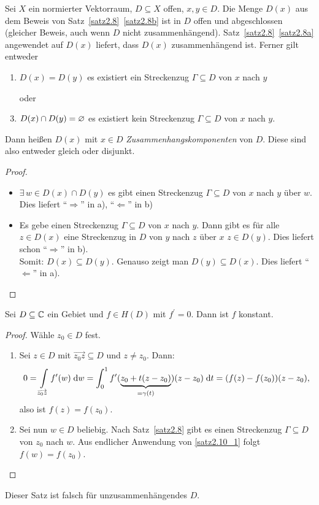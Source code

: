 \documentclass[a4paper,twoside,DIV15,BCOR12mm]{scrbook}
\begin{document}
\begin{bem} \label{bem2.9}
  Sei $X$ ein normierter Vektorraum, $D\subseteq X$ offen, $x, y\in D$. Die Menge $D(x)$ aus dem Beweis von
  Satz~\ref{satz2.8}~\ref{satz2.8b} ist in $D$ offen und abgeschlossen (gleicher Beweis, auch wenn $D$ nicht
  zusammenhängend). Satz~\ref{satz2.8}~\ref{satz2.8a} angewendet auf $D(x)$ liefert, dass $D(x)$ zusammenhängend ist. Ferner
  gilt entweder
  \begin{enumerate}
  \item $D(x)=D(y)$ \gdw es existiert ein Streckenzug $\Gamma\subseteq D$ von $x$ nach $y$
  \item[oder]
  \item $D(x)\cap D(y)=\varnothing$ \gdw es existiert kein Streckenzug $\Gamma\subseteq D$ von $x$ nach $y$.
  \end{enumerate}
  Dann heißen $D(x)$ mit $x\in D$ \emph{Zusammenhangskomponenten} von $D$. Diese sind also entweder gleich oder disjunkt.
\end{bem}
\begin{proof}
  \begin{itemize}
  \item $\exists\,w\in D(x)\cap D(y)$ \folgt es gibt einen Streckenzug $\Gamma\subseteq D$ von $x$ nach $y$ über $w$. Dies
    liefert "`$\Rightarrow$"' in a), "`$\Leftarrow$"' in b)
  \item Es gebe einen Streckenzug $\Gamma\subseteq D$ von $x$ nach $y$. Dann gibt es für alle $z\in D(x)$ eine Streckenzug in
    $D$ von $y$ nach $z$ über $x$ \folgt $z\in D(y)$. Dies liefert schon "`$\Rightarrow$"' in b).\\
    Somit: $D(x)\subseteq D(y)$. Genauso zeigt man $D(y)\subseteq D(x)$. Dies liefert "`$\Leftarrow$"' in a). \qedhere
  \end{itemize}
\end{proof}

\begin{satz} \label{satz2.10}
  Sei $D\subseteq\mathbb{C}$ ein Gebiet und $f\in H(D)$ mit $f^\prime=0$. Dann ist $f$ konstant.
\end{satz}
\begin{proof}
  Wähle $z_0\in D$ fest.
  \begin{enumerate}
  \item \label{satz2.10_1} Sei $z\in D$ mit $\overrightarrow{z_0z}\subseteq D$ und $z\neq z_0$. Dann:
    \[ 0=\int\limits_{\overrightarrow{z_0z}}^{}{f^\prime(w)}\;\mathrm{d}w =
    \int_{0}^{1}{f^\prime(\underbrace{z_0+t(z-z_0)}_{=\gamma(t)})(z-z_0)}\;\mathrm{d} t = (f(z)-f(z_0))(z-z_0), \]
    also ist $f(z)=f(z_0)$.
  \item Sei nun $w\in D$ beliebig. Nach Satz~\ref{satz2.8} gibt es einen Streckenzug $\Gamma\subseteq D$ von $z_0$ nach $w$. Aus
    endlicher Anwendung von \ref{satz2.10_1} folgt $f(w)=f(z_0)$. \qedhere 
  \end{enumerate}
\end{proof}
\begin{bem*}
  Dieser Satz ist falsch für unzusammenhängendes $D$.
\end{bem*}
\end{document}
